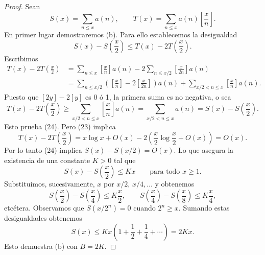 \documentclass[12pt,a4paper]{book}
\begin{document}
    \begin{proof}
        Sean
        \begin{equation*}
            S(x)=\sum_{n\leq x}a(n),\qquad T(x)=\sum_{n\leq x}a(n)\left[\frac{x}{n}\right].
        \end{equation*}
        En primer lugar demostraremos (b). Para ello establecemos la desigualdad
        \begin{equation}
            S(x)-S\left(\frac{x}{2}\right)\leq T(x)-2T\left(\frac{x}{2}\right).
        \end{equation}
        Escribimos
        \begin{align*}
            T(x)-2T\left(\frac{x}{2}\right)&=\sum_{n\leq x}\left[\frac{x}{n}\right]a(n)
            -2\sum_{n\leq x/2}\left[\frac{x}{2n}\right]a(n)\\
            &=\sum_{n\leq x/2}\left(\left[\frac{x}{n}\right]-2\left[\frac{x}{2n}\right]\right)a(n)
            +\sum_{x/2<n\leq x}\left[\frac{x}{n}\right]a(n).
        \end{align*}
        Puesto que $[2y]-2[y]$ es 0 ó 1, la primera suma es no negativa, o sea
        \begin{equation*}
            T(x)-2T\left(\frac{x}{2}\right)\geq\sum_{x/2<n\leq x}\left[\frac{x}{n}\right]a(n)
            =\sum_{x/2<n\leq x}a(n)=S(x)-S\left(\frac{x}{2}\right).
        \end{equation*}
        Esto prueba (24). Pero (23) implica
        \begin{equation*}
            T(x)-2T\left(\frac{x}{2}\right)=x\log x+O(x)-2\left(\frac{x}{2}\log\frac{x}{2}+O(x)\right)=O(x).
        \end{equation*}
        Por lo tanto (24) implica $S(x)-S(x/2)=O(x)$. Lo que asegura la existencia de
        una constante $K>0$ tal que
        \begin{equation*}
            S(x)-S\left(\frac{x}{2}\right)\leq Kx\qquad\text{para todo } x\geq1.
        \end{equation*}
        Substituimos, sucesivamente, $x$ por $x/2$, $x/4,\dots$ y obtenemos
        \begin{equation*}
            S\left(\frac{x}{2}\right)-S\left(\frac{x}{4}\right)\leq K\frac{x}{2},\qquad
            S\left(\frac{x}{4}\right)-S\left(\frac{x}{8}\right)\leq K\frac{x}{4},
        \end{equation*}
        etcétera. Observamos que $S(x/2^{n})=0$ cuando $2^{n}\geq x$. Sumando estas
        desigualdades obtenemos
        \begin{equation*}
            S(x)\leq Kx\left(1+\frac{1}{2}+\frac{1}{4}+\cdots\right)=2Kx.
        \end{equation*}
        Esto demuestra (b) con $B=2K$.


\end{proof}
\end{document}
